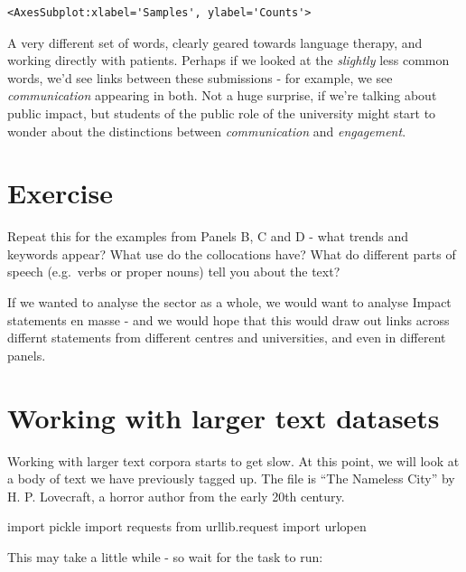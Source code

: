 \documentclass[
  letterpaper,
  DIV=11,
  numbers=noendperiod]{scrreprt}
\newenvironment{Shaded}{\begin{snugshade}}{\end{snugshade}}
\newcommand{\ImportTok}[1]{\textcolor[rgb]{0.00,0.46,0.62}{#1}}
\newcommand{\NormalTok}[1]{\textcolor[rgb]{0.00,0.23,0.31}{#1}}
\begin{document}
\begin{verbatim}
<AxesSubplot:xlabel='Samples', ylabel='Counts'>
\end{verbatim}

A very different set of words, clearly geared towards language therapy,
and working directly with patients. Perhaps if we looked at the
\emph{slightly} less common words, we'd see links between these
submissions - for example, we see \emph{communication} appearing in
both. Not a huge surprise, if we're talking about public impact, but
students of the public role of the university might start to wonder
about the distinctions between \emph{communication} and
\emph{engagement}.

\hypertarget{exercise-9}{%
\section{Exercise}\label{exercise-9}}

Repeat this for the examples from Panels B, C and D - what trends and
keywords appear? What use do the collocations have? What do different
parts of speech (e.g.~verbs or proper nouns) tell you about the text?

If we wanted to analyse the sector as a whole, we would want to analyse
Impact statements en masse - and we would hope that this would draw out
links across differnt statements from different centres and
universities, and even in different panels.

\hypertarget{working-with-larger-text-datasets}{%
\section{Working with larger text
datasets}\label{working-with-larger-text-datasets}}

Working with larger text corpora starts to get slow. At this point, we
will look at a body of text we have previously tagged up. The file is
``The Nameless City'' by H. P. Lovecraft, a horror author from the early
20th century.

\begin{Shaded}
\begin{Highlighting}[]
\ImportTok{import}\NormalTok{ pickle}
\ImportTok{import}\NormalTok{ requests}
\ImportTok{from}\NormalTok{ urllib.request }\ImportTok{import}\NormalTok{ urlopen}
\end{Highlighting}
\end{Shaded}

This may take a little while - so wait for the task to run:
\end{document}
